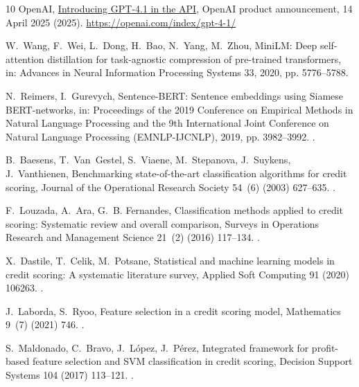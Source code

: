 \documentclass[preprint,12pt]{elsarticle}
\begin{document}
\begin{thebibliography}{10}
{OpenAI}, \href{https://openai.com/index/gpt-4-1/}{Introducing {GPT-4.1} in the
  {API}}, OpenAI product announcement, 14 April 2025 (2025).
\newline\urlprefix\url{https://openai.com/index/gpt-4-1/}

W.~Wang, F.~Wei, L.~Dong, H.~Bao, N.~Yang, M.~Zhou, {MiniLM}: Deep
  self-attention distillation for task-agnostic compression of pre-trained
  transformers, in: Advances in Neural Information Processing Systems 33, 2020,
  pp. 5776--5788.

N.~Reimers, I.~Gurevych, Sentence-{BERT}: Sentence embeddings using {S}iamese
  {BERT}-networks, in: Proceedings of the 2019 Conference on Empirical Methods
  in Natural Language Processing and the 9th International Joint Conference on
  Natural Language Processing (EMNLP-IJCNLP), 2019, pp. 3982--3992.
\newblock \href {https://doi.org/10.18653/v1/D19-1410}
  {}.

B.~Baesens, T.~Van~Gestel, S.~Viaene, M.~Stepanova, J.~Suykens, J.~Vanthienen,
  Benchmarking state-of-the-art classification algorithms for credit scoring,
  Journal of the Operational Research Society 54~(6) (2003) 627--635.
\newblock \href {https://doi.org/10.1057/palgrave.jors.2601545}
  {}.

F.~Louzada, A.~Ara, G.~B. Fernandes, Classification methods applied to credit
  scoring: Systematic review and overall comparison, Surveys in Operations
  Research and Management Science 21~(2) (2016) 117--134.
\newblock \href {https://doi.org/10.1016/j.sorms.2016.10.001}
  {}.

X.~Dastile, T.~Celik, M.~Potsane, Statistical and machine learning models in
  credit scoring: A systematic literature survey, Applied Soft Computing 91
  (2020) 106263.
\newblock \href {https://doi.org/10.1016/j.asoc.2020.106263}
  {}.

J.~Laborda, S.~Ryoo, Feature selection in a credit scoring model, Mathematics
  9~(7) (2021) 746.
\newblock \href {https://doi.org/10.3390/math9070746}
  {}.

S.~Maldonado, C.~Bravo, J.~L{\'o}pez, J.~P{\'e}rez, Integrated framework for
  profit-based feature selection and {SVM} classification in credit scoring,
  Decision Support Systems 104 (2017) 113--121.
\newblock \href {https://doi.org/10.1016/j.dss.2017.10.007}
  {}.


\end{thebibliography}
\end{document}
